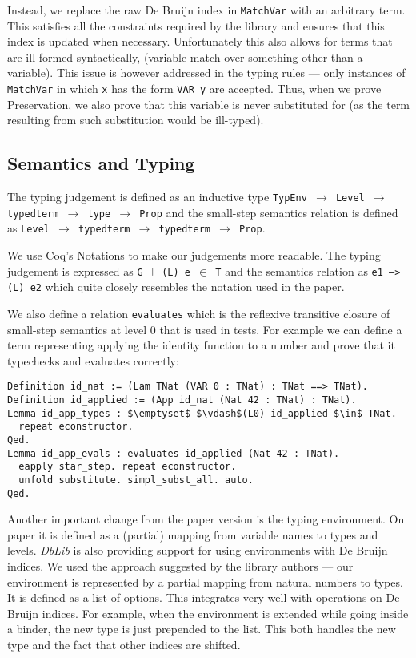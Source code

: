 \documentclass[runningheads]{article}
\begin{document}
Instead, we replace the raw De Bruijn index in \texttt{MatchVar} with an arbitrary term. This satisfies all the constraints required by the library and ensures that this index is updated when necessary. Unfortunately this also allows for terms that are ill-formed syntactically, (variable match over something other than a variable). This issue is however addressed in the typing rules --- only instances of \texttt{MatchVar} in which \texttt{x} has the form \texttt{VAR y} are accepted. Thus, when we prove Preservation, we also prove that this variable is never substituted for (as the term resulting from such substitution would be ill-typed).

\subsection{Semantics and Typing}
\label{finalformencoding}

The typing judgement is defined as an inductive type \texttt{TypEnv $\to$ Level $\to$ typedterm $\to$ type $\to$ Prop} and the small-step semantics relation is defined as \texttt{Level $\to$ typedterm $\to$ typedterm $\to$ Prop}. 

We use Coq's Notations to make our judgements more readable. The typing judgement is expressed as \texttt{G $\vdash$(L) e $\in$ T} and the semantics relation as \texttt{e1 -->(L) e2} which quite closely resembles the notation used in the paper.

We also define a relation \texttt{evaluates} which is the reflexive transitive closure of small-step semantics at level 0 that is used in tests. For example we can define a term representing applying the identity function to a number and prove that it typechecks and evaluates correctly:
\begin{lstlisting}[mathescape=true]
Definition id_nat := (Lam TNat (VAR 0 : TNat) : TNat ==> TNat).
Definition id_applied := (App id_nat (Nat 42 : TNat) : TNat).
Lemma id_app_types : $\emptyset$ $\vdash$(L0) id_applied $\in$ TNat.
  repeat econstructor.
Qed.
Lemma id_app_evals : evaluates id_applied (Nat 42 : TNat).
  eapply star_step. repeat econstructor.
  unfold substitute. simpl_subst_all. auto.
Qed.
\end{lstlisting}

Another important change from the paper version is the typing environment. On paper it is defined as a (partial) mapping from variable names to types and levels.
\textit{DbLib} is also providing support for using environments with De Bruijn indices. We used the approach suggested by the library authors --- our environment is represented by a partial mapping from natural numbers to types. It is defined as a list of options. This integrates very well with operations on De Bruijn indices. For example, when the environment is extended while going inside a binder, the new type is just prepended to the list. This both handles the new type and the fact that other indices are shifted.
\end{document}
